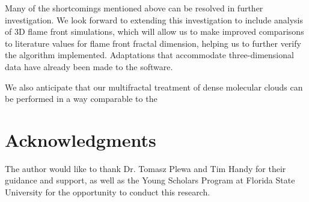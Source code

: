 \documentclass[iop]{emulateapj}
\begin{document}
Many of the shortcomings mentioned above can be resolved in further investigation. We look forward to extending this investigation to include analysis of 3D flame front simulations, which will allow us to make improved comparisons to literature values for flame front fractal dimension, helping us to further verify the algorithm implemented. Adaptations that accommodate three-dimensional data have already been made to the software.

We also anticipate that our multifractal treatment of dense molecular clouds can be performed in a way comparable to the 

\section{Acknowledgments}\label{s:ack}
The author would like to thank Dr. Tomasz Plewa and Tim Handy for their guidance and support, as well as the Young Scholars Program at Florida State University for the opportunity to conduct this research.
%
%


%
%
%
\end{document}
